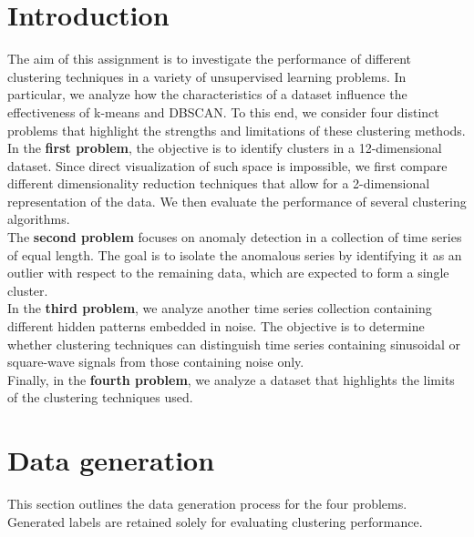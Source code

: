 \documentclass[prl,twocolumn]{revtex4-1}
\begin{document}
\section{Introduction}
\noindent The aim of this assignment is to investigate the performance of different clustering techniques in a variety of unsupervised learning problems.
In particular, we analyze how the characteristics of a dataset influence the effectiveness of k-means and DBSCAN.
To this end, we consider four distinct problems that highlight the strengths and limitations of these clustering methods.\\
\noindent In the \textbf{first problem}, the objective is to identify clusters in a 
12-dimensional dataset.
Since direct visualization of such space is impossible, we first compare different dimensionality reduction techniques that allow for a 2-dimensional representation of the data.
We then evaluate the performance of several clustering algorithms. \\
\noindent The \textbf{second problem} focuses on anomaly detection in a collection of time series of equal length.
The goal is to isolate the anomalous series by identifying it as an outlier with respect to the remaining data, which are expected to form a single cluster. \\
\noindent In the \textbf{third problem}, we analyze another time series collection containing different hidden patterns embedded in noise.
The objective is to determine whether clustering techniques can distinguish time series containing sinusoidal or square-wave signals from those containing noise only.\\
\noindent Finally, in the \textbf{fourth problem}, we analyze a dataset that highlights the limits of the clustering techniques used.
\vspace{-1.5em}
\section{Data generation}
\noindent This section outlines the data generation process for the four problems.
Generated labels are retained solely for evaluating clustering performance.
\vspace{-1.5em}
\end{document}
